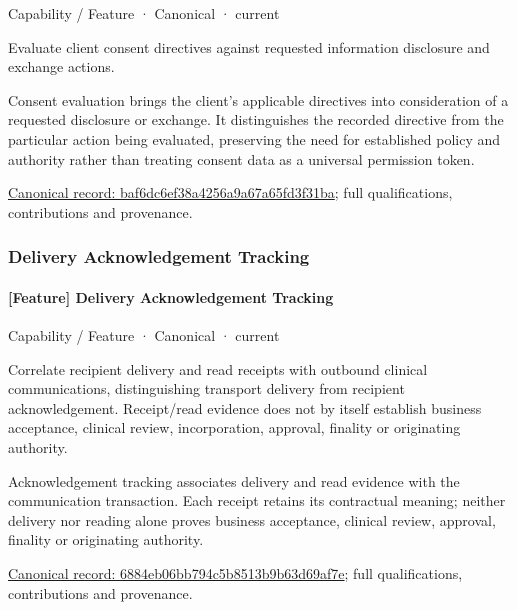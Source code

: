 \label{element:baf6dc6ef38a4256a9a67a65fd3f31ba}
{\small Capability / Feature · Canonical · current}\par

Evaluate client consent directives against requested information disclosure and exchange actions.



Consent evaluation brings the client's applicable directives into consideration of a requested disclosure or exchange. It distinguishes the recorded directive from the particular action being evaluated, preserving the need for established policy and authority rather than treating consent data as a universal permission token.


{\footnotesize \href{../../../../continuum/strategy/capability/feature/baf6dc6ef38a4256a9a67a65fd3f31ba.md}{Canonical record: baf6dc6ef38a4256a9a67a65fd3f31ba}; full qualifications, contributions and provenance.}\par
\subsubsection{Delivery Acknowledgement Tracking}

\paragraph{[Feature] Delivery Acknowledgement Tracking}

\label{element:6884eb06bb794c5b8513b9b63d69af7e}
{\small Capability / Feature · Canonical · current}\par

Correlate recipient delivery and read receipts with outbound clinical communications, distinguishing transport delivery from recipient acknowledgement. Receipt/read evidence does not by itself establish business acceptance, clinical review, incorporation, approval, finality or originating authority.



Acknowledgement tracking associates delivery and read evidence with the communication transaction. Each receipt retains its contractual meaning; neither delivery nor reading alone proves business acceptance, clinical review, approval, finality or originating authority.


{\footnotesize \href{../../../../continuum/strategy/capability/feature/6884eb06bb794c5b8513b9b63d69af7e.md}{Canonical record: 6884eb06bb794c5b8513b9b63d69af7e}; full qualifications, contributions and provenance.}\par
